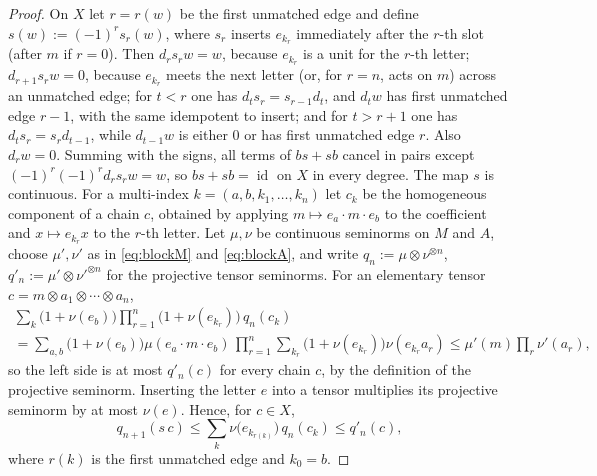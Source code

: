 \documentclass[11pt]{amsart}
\theoremstyle{definition}
\theoremstyle{remark}
\newcommand{\id}{\operatorname{id}}
\begin{document}
\begin{proof}
On $X$ let $r=r(w)$ be the first unmatched edge and define
$s(w):=(-1)^{r}s_{r}(w)$, where $s_r$ inserts $e_{k_r}$ immediately after the
$r$-th slot (after $m$ if $r=0$).  Then $d_rs_rw=w$, because $e_{k_r}$ is a
unit for the $r$-th letter; $d_{r+1}s_rw=0$, because $e_{k_r}$ meets the next
letter (or, for $r=n$, acts on $m$) across an unmatched edge; for $t<r$ one has
$d_ts_r=s_{r-1}d_t$, and $d_tw$ has first unmatched edge $r-1$, with the same
idempotent to insert; and for $t>r+1$ one has $d_ts_r=s_rd_{t-1}$, while
$d_{t-1}w$ is either $0$ or has first unmatched edge $r$.  Also $d_rw=0$.
Summing with the signs, all terms of $bs+sb$ cancel in pairs except
$(-1)^{r}(-1)^{r}d_rs_rw=w$, so $bs+sb=\id$ on $X$ in every degree.
The map $s$ is continuous.  For a multi-index $k=(a,b,k_1,\dots,k_n)$ let $c_k$
be the homogeneous component of a chain $c$, obtained by applying
$m\mapsto e_a\cdot m\cdot e_b$ to the coefficient and $x\mapsto e_{k_r}x$ to
the $r$-th letter.  Let $\mu,\nu$ be continuous seminorms on $M$ and $A$,
choose $\mu',\nu'$ as in \eqref{eq:blockM} and \eqref{eq:blockA}, and write
$q_n:=\mu\otimes\nu^{\otimes n}$, $q'_n:=\mu'\otimes\nu'^{\otimes n}$ for the
projective tensor seminorms.  For an elementary tensor
$c=m\otimes a_1\otimes\cdots\otimes a_n$,
\begin{multline*}
\sum_k\bigl(1+\nu(e_b)\bigr)\prod_{r=1}^{n}\bigl(1+\nu(e_{k_r})\bigr)\,q_n(c_k)\\
=\sum_{a,b}\bigl(1+\nu(e_b)\bigr)\mu(e_a\cdot m\cdot e_b)\,
\prod_{r=1}^{n}\sum_{k_r}\bigl(1+\nu(e_{k_r})\bigr)\nu(e_{k_r}a_r)
\le\mu'(m)\prod_r\nu'(a_r),
\end{multline*}
so the left side is at most $q'_n(c)$ for every chain $c$, by the definition
of the projective seminorm.  Inserting the letter $e$ into a tensor multiplies
its projective seminorm by at most $\nu(e)$.  Hence, for $c\in X$,
\[
q_{n+1}(s\,c)\le\sum_k\nu\bigl(e_{k_{r(k)}}\bigr)\,q_n(c_k)\le q'_n(c),
\]
where $r(k)$ is the first unmatched edge and $k_0=b$.
\end{proof}
\end{document}
